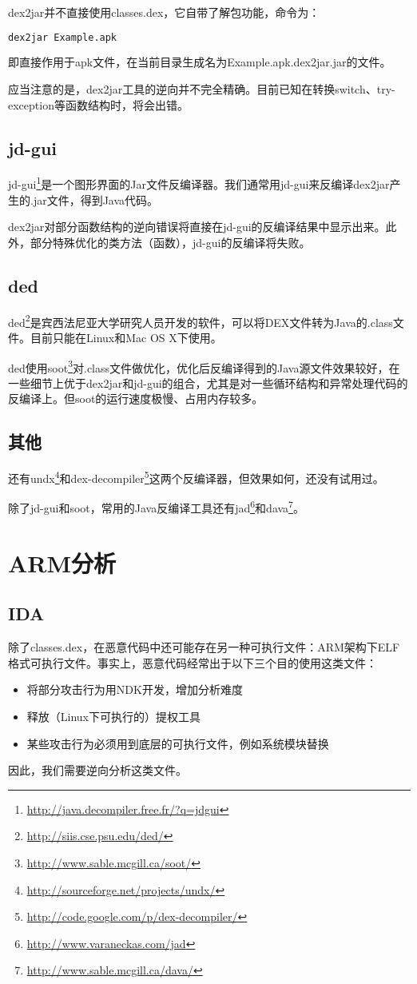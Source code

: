 dex2jar并不直接使用classes.dex，它自带了解包功能，命令为：
\begin{lstlisting}[language=bash, numbers=none]
dex2jar Example.apk
\end{lstlisting}
即直接作用于apk文件，在当前目录生成名为Example.apk.dex2jar.jar的文件。

应当注意的是，dex2jar工具的逆向并不完全精确。目前已知在转换switch、try-exception等函数结构时，将会出错。
\subsection{jd-gui}
jd-gui\footnote{\url{http://java.decompiler.free.fr/?q=jdgui}}是一个图形界面的Jar文件反编译器。我们通常用jd-gui来反编译dex2jar产生的.jar文件，得到Java代码。

dex2jar对部分函数结构的逆向错误将直接在jd-gui的反编译结果中显示出来。此外，部分特殊优化的类方法（函数），jd-gui的反编译将失败。

\subsection{ded}
ded\footnote{\url{http://siis.cse.psu.edu/ded/}}是宾西法尼亚大学研究人员开发的软件，可以将DEX文件转为Java的.class文件。目前只能在Linux和Mac OS X下使用。

ded使用soot\footnote{\url{http://www.sable.mcgill.ca/soot/}}对.class文件做优化，优化后反编译得到的Java源文件效果较好，在一些细节上优于dex2jar和jd-gui的组合，尤其是对一些循环结构和异常处理代码的反编译上。但soot的运行速度极慢、占用内存较多。

\subsection{其他}
还有undx\footnote{\url{http://sourceforge.net/projects/undx/}}和dex-decompiler\footnote{\url{http://code.google.com/p/dex-decompiler/}}这两个反编译器，但效果如何，还没有试用过。

除了jd-gui和soot，常用的Java反编译工具还有jad\footnote{\url{http://www.varaneckas.com/jad}}和dava\footnote{\url{http://www.sable.mcgill.ca/dava/}}。

\section{ARM分析}
\subsection{IDA}
除了classes.dex，在恶意代码中还可能存在另一种可执行文件：ARM架构下ELF格式可执行文件。事实上，恶意代码经常出于以下三个目的使用这类文件：
\begin{itemize}
	\item 将部分攻击行为用NDK开发，增加分析难度
	\item 释放（Linux下可执行的）提权工具
	\item 某些攻击行为必须用到底层的可执行文件，例如系统模块替换
\end{itemize}
因此，我们需要逆向分析这类文件。

